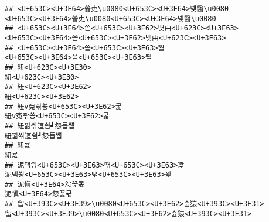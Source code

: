 \documentclass[]{article}
\begin{document}
\begin{verbatim}
## <U+653C><U+3E64>쑕吏\u0080<U+653C><U+3E64>넻醫\u0080                                                                                                                                             <U+653C><U+3E64>쑕吏\u0080<U+653C><U+3E64>넻醫\u0080
## <U+653C><U+3E64>쓷<U+653C><U+3E62>뱾由<U+623C><U+3E63>                                                                                                                                                     <U+653C><U+3E64>쓷<U+653C><U+3E62>뱾由<U+623C><U+3E63>
## <U+653C><U+3E64>씉<U+653C><U+3E63>뿰                                                                                                                                                                             <U+653C><U+3E64>씉<U+653C><U+3E63>뿰
## 紐<U+623C><U+3E30>                                                                                                                                                                                                     紐<U+623C><U+3E30>
## 紐<U+623C><U+3E62>                                                                                                                                                                                                     紐<U+623C><U+3E62>
## 紐v寃좎쑝<U+653C><U+3E62>굹                                                                                                                                                                                   紐v寃좎쑝<U+653C><U+3E62>굹
## 紐낆씪洹쇰┛怨듭썝                                                                                                                                                                                         紐낆씪洹쇰┛怨듭썝
## 紐룞                                                                                                                                                                                                                     紐룞
## 泥댁쑁<U+653C><U+3E63>떆<U+653C><U+3E63>꽕                                                                                                                                                                 泥댁쑁<U+653C><U+3E63>떆<U+653C><U+3E63>꽕
## 泥愼<U+3E64>怨꾩쿇                                                                                                                                                                                               泥愼<U+3E64>怨꾩쿇
## 留<U+393C><U+3E39>\u0080<U+653C><U+3E62>슌猿<U+393C><U+3E31>                                                                                                                                         留<U+393C><U+3E39>\u0080<U+653C><U+3E62>슌猿<U+393C><U+3E31>

\end{verbatim}
\end{document}
